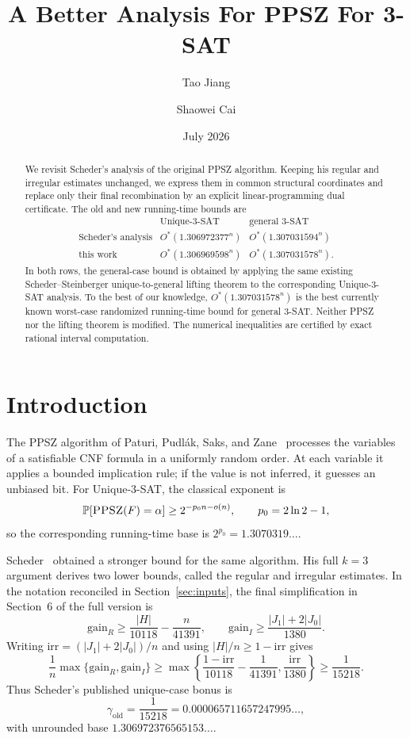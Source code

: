 \documentclass[11pt]{article}
\title{A Better Analysis For PPSZ For 3-SAT}
\author{Tao Jiang \and Shaowei Cai}
\date{July 2026}
\newcommand{\PPSZ}{\textnormal{\textsc{PPSZ}}}
\newcommand{\gain}{\mathrm{gain}}
\newcommand{\Prb}{\mathbb P}
\begin{document}
\maketitle

\begin{abstract}
We revisit Scheder's analysis of the original PPSZ algorithm.  Keeping his regular and irregular estimates unchanged, we express them in common structural coordinates and replace only their final recombination by an explicit linear-programming dual certificate.  The old and new running-time bounds are
\[
\begin{array}{c|cc}
 & \text{Unique-$3$-SAT} & \text{general $3$-SAT} \\
\hline
\text{Scheder's analysis} & O^*(1.306972377^n) & O^*(1.307031594^n) \\
\text{this work} & O^*(1.306969598^n) & O^*(1.307031578^n).
\end{array}
\]
In both rows, the general-case bound is obtained by applying the same existing Scheder--Steinberger unique-to-general lifting theorem to the corresponding Unique-$3$-SAT analysis.  To the best of our knowledge, $O^*(1.307031578^n)$ is the best currently known worst-case randomized running-time bound for general $3$-SAT.  Neither PPSZ nor the lifting theorem is modified.  The numerical inequalities are certified by exact rational interval computation.
\end{abstract}

\section{Introduction}\label{sec:intro}

The PPSZ algorithm of Paturi, Pudl\'ak, Saks, and Zane~\cite{PPSZ} processes the variables of a satisfiable CNF formula in a uniformly random order.  At each variable it applies a bounded implication rule; if the value is not inferred, it guesses an unbiased bit.  For Unique-$3$-SAT, the classical exponent is
\[
 \Prb[\PPSZ(F)=\alpha]
 \ge 2^{-p_0n-o(n)},
 \qquad
 p_0=2\ln 2-1,
\]
so the corresponding running-time base is $2^{p_0}=1.3070319\ldots$.

Scheder~\cite{SchederFOCS,SchederFull,SchederJournal} obtained a stronger bound for the same algorithm.  His full $k=3$ argument derives two lower bounds, called the regular and irregular estimates.  In the notation reconciled in Section~\ref{sec:inputs}, the final simplification in Section~6 of the full version is
\begin{equation}\label{eq:old-endgame-inputs}
 \gain_R\ge \frac{|H|}{10118}-\frac{n}{41391},
 \qquad
 \gain_I\ge \frac{|J_1|+2|J_0|}{1380}.
\end{equation}
Writing $\mathrm{irr}=(|J_1|+2|J_0|)/n$ and using $|H|/n\ge 1-\mathrm{irr}$ gives
\begin{equation}\label{eq:old-endgame}
 \frac1n\max\{\gain_R,\gain_I\}
 \ge
 \max\left\{
   \frac{1-\mathrm{irr}}{10118}-\frac1{41391},
   \frac{\mathrm{irr}}{1380}
 \right\}
 \ge \frac1{15218}.
\end{equation}
Thus Scheder's published unique-case bonus is
\[
 \gamma_{\mathrm{old}}=\frac1{15218}
 =0.000065711657247995\ldots,
\]
with unrounded base $1.306972376565153\ldots$.
\end{document}
